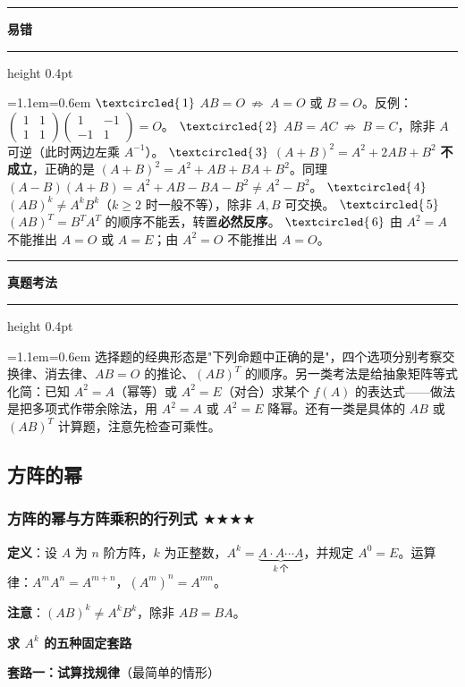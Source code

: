 \documentclass[11pt,openany,UTF8]{ctexbook}
\newcommand{\circled}[1]{\textcircled{\scriptsize\,#1}}
\newcommand{\callouthead}[2]{%
  \par\addvspace{7pt}\noindent
  {\color{#1}\rule[-0.15em]{3pt}{1.05em}}\hspace{0.5em}%
  {\bfseries\color{#1}#2}\par\nobreak\vspace{-0.35em}%
  {\color{rulesep}\hrule height 0.4pt}\nobreak\vspace{0.45em}%
  \begingroup\small\setlength{\parindent}{0pt}%
  \leftskip=1.1em\rightskip=0.6em\noindent\ignorespaces}
\newcommand{\calloutend}{\par\endgroup\addvspace{7pt}}
\newenvironment{callwarn}[1]{\callouthead{warnbar}{#1}}{\calloutend}
\newenvironment{callexam}[1]{\callouthead{exambar}{#1}}{\calloutend}
\begin{document}
\begin{callwarn}{易错}
$\circled{1}$ $AB=O\ \not\Rightarrow\ A=O$ 或 $B=O$。反例：$\begin{pmatrix}1&1\\1&1\end{pmatrix}\begin{pmatrix}1&-1\\-1&1\end{pmatrix}=O$。 $\circled{2}$ $AB=AC\ \not\Rightarrow\ B=C$，除非 $A$ 可逆（此时两边左乘 $A^{-1}$）。 $\circled{3}$ $(A+B)^2=A^2+2AB+B^2$ \textbf{不成立}，正确的是 $(A+B)^2=A^2+AB+BA+B^2$。同理 $(A-B)(A+B)=A^2+AB-BA-B^2\ne A^2-B^2$。 $\circled{4}$ $(AB)^k\ne A^kB^k$（$k\ge2$ 时一般不等），除非 $A,B$ 可交换。 $\circled{5}$ $(AB)^T=B^TA^T$ 的顺序不能丢，转置\textbf{必然反序}。 $\circled{6}$ 由 $A^2=A$ 不能推出 $A=O$ 或 $A=E$；由 $A^2=O$ 不能推出 $A=O$。

\end{callwarn}

\begin{callexam}{真题考法}
选择题的经典形态是"下列命题中正确的是"，四个选项分别考察交换律、消去律、$AB=O$ 的推论、$(AB)^T$ 的顺序。另一类考法是给抽象矩阵等式化简：已知 $A^2=A$（幂等）或 $A^2=E$（对合）求某个 $f(A)$ 的表达式——做法是把多项式作带余除法，用 $A^2=A$ 或 $A^2=E$ 降幂。还有一类是具体的 $AB$ 或 $(AB)^T$ 计算题，注意先检查可乘性。

\end{callexam}

\subsection{方阵的幂}

\subsubsection{方阵的幂与方阵乘积的行列式 $\bigstar$$\bigstar$$\bigstar$$\bigstar$}

\textbf{定义}：设 $A$ 为 $n$ 阶方阵，$k$ 为正整数，$A^k=\underbrace{A\cdot A\cdots A}_{k\ \text{个}}$，并规定 $A^0=E$。运算律：$A^mA^n=A^{m+n}$，$(A^m)^n=A^{mn}$。

\textbf{注意}：$(AB)^k\ne A^kB^k$，除非 $AB=BA$。

\textbf{求 $A^k$ 的五种固定套路}

\textbf{套路一：试算找规律}（最简单的情形）
\end{document}
